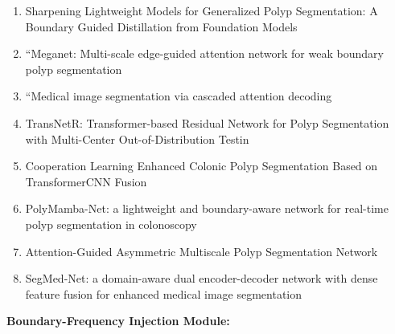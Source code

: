 \begin{enumerate}
\def\labelenumi{\arabic{enumi}.}
\item
  Sharpening Lightweight Models for Generalized Polyp Segmentation: A
  Boundary Guided Distillation from Foundation Models
\item
  ``Meganet: Multi-scale edge-guided attention network for weak boundary
  polyp segmentation
\item
  ``Medical image segmentation via cascaded attention decoding
\item
  TransNetR: Transformer-based Residual Network for Polyp Segmentation
  with Multi-Center Out-of-Distribution Testin
\item
  Cooperation Learning Enhanced Colonic Polyp Segmentation Based on
  TransformerCNN Fusion
\item
  PolyMamba-Net: a lightweight and boundary-aware network for real-time
  polyp segmentation in colonoscopy
\item
  Attention-Guided Asymmetric Multiscale Polyp Segmentation Network
\item
  SegMed-Net: a domain-aware dual encoder-decoder network with dense
  feature fusion for enhanced medical image segmentation
\end{enumerate}

\textbf{Boundary-Frequency Injection Module:}

